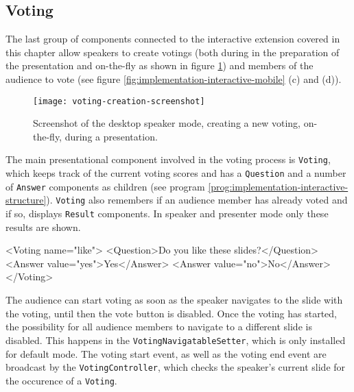 \subsection{Voting}
\label{sec:implementation-interactive-voting}

The last group of components connected to the interactive extension covered in this chapter allow speakers to create votings (both during in the preparation of the presentation and on-the-fly as shown in figure \ref{fig:implementation-interactive-voting}) and members of the audience to vote (see figure \ref{fig:implementation-interactive-mobile} (c) and (d)).

\begin{figure}
\centering
\texttt{[image: voting-creation-screenshot]}
\caption{Screenshot of the desktop speaker mode, creating a new voting, on-the-fly, during a presentation.}
\label{fig:implementation-interactive-voting}
\end{figure}

The main presentational component involved in the voting process is \texttt{Voting}, which keeps track of the current voting scores and has a \texttt{Question} and a number of \texttt{Answer} components as children (see program \ref{prog:implementation-interactive-structure}). \texttt{Voting} also remembers if an audience member has already voted and if so, displays \texttt{Result} components. In speaker and presenter mode only these results are shown.

\begin{program}
\caption{Example code for preparing a slide with voting.}
\label{prog:implementation-interactive-structure}
\begin{JsCode}
<Voting name="like">
  <Question>Do you like these slides?</Question>
  <Answer value="yes">Yes</Answer>
  <Answer value="no">No</Answer>
</Voting>
\end{JsCode}
\end{program}

The audience can start voting as soon as the speaker navigates to the slide with the voting, until then the vote button is disabled. Once the voting has started, the possibility for all audience members to navigate to a different slide is disabled. This happens in the \texttt{VotingNavigatableSetter}, which is only installed for default mode. The voting start event, as well as the voting end event are broadcast by the \texttt{VotingController}, which checks the speaker's current slide for the occurence of a \texttt{Voting}.


